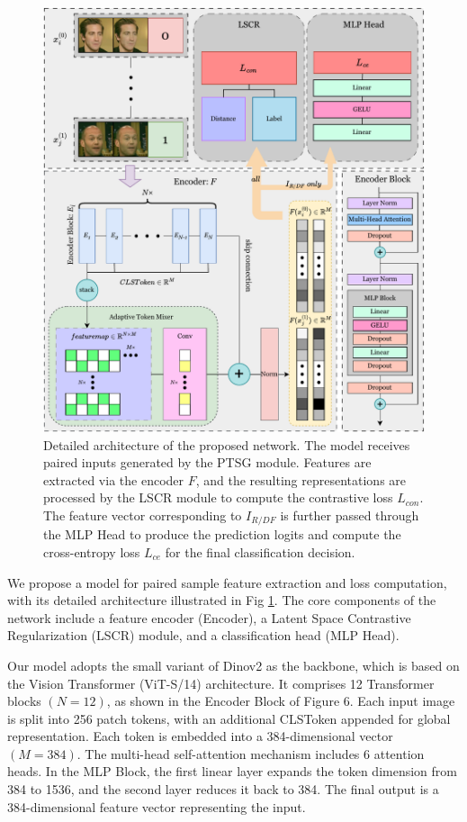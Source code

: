 \documentclass[final,5p,times]{elsarticle}
\begin{document}
\begin{figure}[htb]
\centering
\includegraphics[width=0.75\linewidth]{images/Fig6.pdf}
\caption{Detailed architecture of the proposed network. The model receives paired inputs generated by the PTSG module. Features are extracted via the encoder $F$, and the resulting representations are processed by the LSCR module to compute the contrastive loss $L_{con}$. The feature vector corresponding to $I_{R/DF}$ is further passed through the MLP Head to produce the prediction logits and compute the cross-entropy loss $L_{ce}$ for the final classification decision.} 
\label{Fig6}
\end{figure}

We propose a model for paired sample feature extraction and loss computation, with its detailed architecture illustrated in Fig \ref{Fig6}. The core components of the network include a feature encoder (Encoder), a Latent Space Contrastive Regularization (LSCR) module, and a classification head (MLP Head).

Our model adopts the small variant of Dinov2 \cite{31} as the backbone, which is based on the Vision Transformer (ViT-S/14) architecture. It comprises 12 Transformer blocks $(N=12)$, as shown in the Encoder Block of Figure 6. Each input image is split into 256 patch tokens, with an additional CLSToken appended for global representation. Each token is embedded into a 384-dimensional vector $(M=384)$. The multi-head self-attention mechanism includes 6 attention heads. In the MLP Block, the first linear layer expands the token dimension from 384 to 1536, and the second layer reduces it back to 384. The final output is a 384-dimensional feature vector representing the input.
\end{document}
